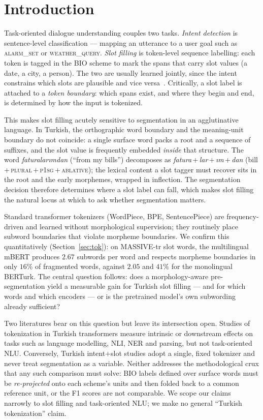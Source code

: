 \documentclass[runningheads]{llncs}
\begin{document}
\section{Introduction}
Task-oriented dialogue understanding couples two tasks. \emph{Intent detection}
is sentence-level classification --- mapping an utterance to a user goal such as
\textsc{alarm\_set} or \textsc{weather\_query}. \emph{Slot filling} is
token-level sequence labelling: each token is tagged in the BIO scheme to mark
the spans that carry slot values (a date, a city, a person). The two are usually
learned jointly, since the intent constrains which slots are plausible and vice
versa~\cite{chen2019bert}. Critically, a slot label is attached to a
\emph{token boundary}: which spans exist, and where they begin and end, is
determined by how the input is tokenized.

This makes slot filling acutely sensitive to segmentation in an agglutinative
language. In Turkish, the orthographic word boundary and the meaning-unit
boundary do not coincide: a single surface word packs a root and a sequence of
suffixes, and the slot value is frequently embedded \emph{inside} that
structure. The word \emph{faturalarımdan} (``from my bills'') decomposes as
\emph{fatura}\,+\,\emph{lar}\,+\,\emph{ım}\,+\,\emph{dan}
(bill\,+\,\textsc{plural}\,+\,\textsc{p1sg}\,+\,\textsc{ablative}); the lexical
content a slot tagger must recover sits in the root and the early morphemes,
wrapped in inflection. The segmentation decision therefore determines where a
slot label can fall, which makes slot filling the natural locus at which to ask
whether segmentation matters.

Standard transformer tokenizers (WordPiece, BPE, SentencePiece) are
frequency-driven and learned without morphological supervision; they routinely
place subword boundaries that violate morpheme boundaries. We confirm this
quantitatively (Section~\ref{sec:tok}): on MASSIVE-tr slot words, the
multilingual mBERT produces $2.67$ subwords per word and respects morpheme
boundaries in only $16\%$ of fragmented words, against $2.05$ and $41\%$ for the
monolingual BERTurk. The central question follows: does a morphology-aware
pre-segmentation yield a measurable gain for Turkish slot filling --- and for
which words and which encoders --- or is the pretrained model's own subwording
already sufficient?

Two literatures bear on this question but leave its intersection open. Studies of
tokenization in Turkish transformers measure intrinsic or downstream effects on
tasks such as language modelling, NLI, NER and parsing, but not task-oriented
NLU. Conversely, Turkish intent$+$slot studies adopt a single, fixed tokenizer
and never treat segmentation as a variable. Neither addresses the methodological
crux that any such comparison must solve: BIO labels defined over surface words
must be \emph{re-projected} onto each scheme's units and then folded back to a
common reference unit, or the F1 scores are not comparable. We scope our claims
narrowly to slot filling and task-oriented NLU; we make no general
``Turkish tokenization'' claim.
\end{document}
